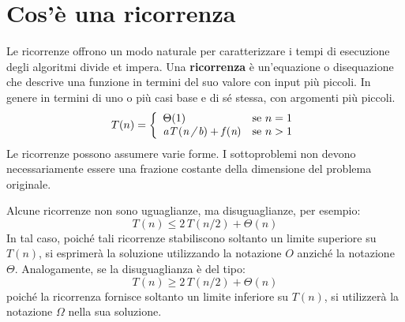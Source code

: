\documentclass[10pt, a4paper]{report}
\begin{document}
\section{Cos'è una ricorrenza}
Le ricorrenze offrono un modo naturale per caratterizzare i tempi di esecuzione degli algoritmi divide et impera. Una \textbf{ricorrenza} è un'equazione o disequazione che descrive una funzione in termini del suo valore con input più piccoli. In genere in termini di uno o più casi base e di sé stessa, con argomenti più piccoli.
\begin{equation}
T(n) = \left\{
\begin{array}{ll}
\Theta(1) & \text{se $n = 1$} \\
\textit{aT\,}(\textit{n\,/\,\textit{b}}) + \textit{f\,}(\textit{n}) & \text{se $n > 1$}
\end{array}\right.
\label{contorno}
\end{equation}
Le ricorrenze possono assumere varie forme. I sottoproblemi non devono necessariamente essere una frazione costante della dimensione del problema originale.

Alcune ricorrenze non sono uguaglianze, ma disuguaglianze, per esempio:
\begin{equation*}
T(n) \leq 2\,T(n/2) + \Theta(n)
\end{equation*}
In tal caso, poiché tali ricorrenze stabiliscono soltanto un limite superiore su $T(n)$, si esprimerà la soluzione utilizzando la notazione $O$ anziché la notazione $\Theta$. Analogamente, se la disuguaglianza è del tipo:
\begin{equation*}
T(n) \geq 2\,T(n/2) + \Theta(n)
\end{equation*}
poiché la ricorrenza fornisce soltanto un limite inferiore su $T(n)$, si utilizzerà la notazione $\Omega$ nella sua soluzione.
\end{document}
